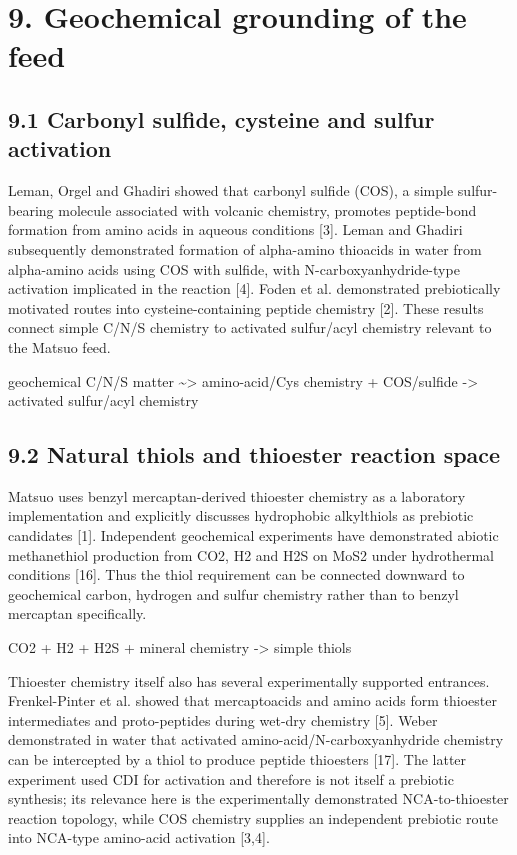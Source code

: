 \documentclass[11pt]{article}
\begin{document}
\hypertarget{geochemical-grounding-of-the-feed}{%
\section*{9. Geochemical grounding of the feed}\label{geochemical-grounding-of-the-feed}}

\hypertarget{carbonyl-sulfide-cysteine-and-sulfur-activation}{%
\subsection*{9.1 Carbonyl sulfide, cysteine and sulfur activation}\label{carbonyl-sulfide-cysteine-and-sulfur-activation}}

Leman, Orgel and Ghadiri showed that carbonyl sulfide (COS), a simple sulfur-bearing molecule associated with volcanic chemistry, promotes peptide-bond formation from amino acids in aqueous conditions {[}3{]}. Leman and Ghadiri subsequently demonstrated formation of alpha-amino thioacids in water from alpha-amino acids using COS with sulfide, with N-carboxyanhydride-type activation implicated in the reaction {[}4{]}. Foden et al. demonstrated prebiotically motivated routes into cysteine-containing peptide chemistry {[}2{]}. These results connect simple C/N/S chemistry to activated sulfur/acyl chemistry relevant to the Matsuo feed.

geochemical C/N/S matter \textasciitilde\textgreater{} amino-acid/Cys chemistry + COS/sulfide -\textgreater{} activated sulfur/acyl chemistry

\hypertarget{natural-thiols-and-thioester-reaction-space}{%
\subsection*{9.2 Natural thiols and thioester reaction space}\label{natural-thiols-and-thioester-reaction-space}}

Matsuo uses benzyl mercaptan-derived thioester chemistry as a laboratory implementation and explicitly discusses hydrophobic alkylthiols as prebiotic candidates {[}1{]}. Independent geochemical experiments have demonstrated abiotic methanethiol production from CO2, H2 and H2S on MoS2 under hydrothermal conditions {[}16{]}. Thus the thiol requirement can be connected downward to geochemical carbon, hydrogen and sulfur chemistry rather than to benzyl mercaptan specifically.

CO2 + H2 + H2S + mineral chemistry -\textgreater{} simple thiols

Thioester chemistry itself also has several experimentally supported entrances. Frenkel-Pinter et al. showed that mercaptoacids and amino acids form thioester intermediates and proto-peptides during wet-dry chemistry {[}5{]}. Weber demonstrated in water that activated amino-acid/N-carboxyanhydride chemistry can be intercepted by a thiol to produce peptide thioesters {[}17{]}. The latter experiment used CDI for activation and therefore is not itself a prebiotic synthesis; its relevance here is the experimentally demonstrated NCA-to-thioester reaction topology, while COS chemistry supplies an independent prebiotic route into NCA-type amino-acid activation {[}3,4{]}.
\end{document}
